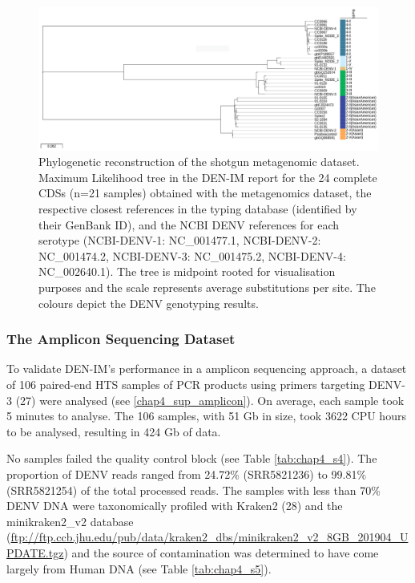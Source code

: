 \begin{figure}[h!]
\centering
\includegraphics[width=\textwidth]{figures/chapter 4/Figure2_nobranchlabels.png}
\caption{Phylogenetic reconstruction of the shotgun metagenomic dataset. Maximum Likelihood tree in the DEN-IM report for the 24 complete CDSs (n=21 samples) obtained with the metagenomics dataset, the respective closest references in the typing database (identified by their GenBank ID), and the NCBI DENV references for each serotype (NCBI-DENV-1: NC\_001477.1, NCBI-DENV-2: NC\_001474.2, NCBI-DENV-3: NC\_001475.2, NCBI-DENV-4: NC\_002640.1). The tree is midpoint rooted for visualisation purposes and the scale represents average substitutions per site. The colours depict the DENV genotyping results.}
\label{fig:chap4_figure2}
\end{figure}

\subsubsection{The Amplicon Sequencing Dataset}

To validate DEN-IM’s performance in a amplicon sequencing approach, a dataset of 106 paired-end HTS samples of PCR products using primers targeting DENV-3 (27) were analysed (see \ref{chap4_sup_amplicon}). On average, each sample took 5 minutes to analyse. The 106 samples, with 51 Gb in size, took 3622 CPU hours to be analysed, resulting in 424 Gb of data. 

No samples failed the quality control block (see Table \ref{tab:chap4_s4}). The proportion of DENV reads ranged from 24.72\% (SRR5821236) to 99.81\% (SRR5821254) of the total processed reads. The samples with less than 70\% DENV DNA were taxonomically profiled with Kraken2 (28) and the minikraken2\_v2 database (\url{ftp://ftp.ccb.jhu.edu/pub/data/kraken2_dbs/minikraken2_v2_8GB_201904_UPDATE.tgz}) and the source of contamination was determined to have come largely from Human DNA (see Table \ref{tab:chap4_s5}).

